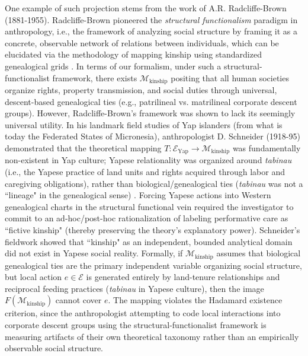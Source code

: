 \documentclass{article}
\theoremstyle{definition}
\begin{document}
One example of such projection stems from the work of A.R. Radcliffe-Brown (1881-1955). Radcliffe-Brown pioneered the \textit{structural functionalism} paradigm in anthropology, i.e., the framework of analyzing social structure by framing it as a concrete, observable network of relations between individuals, which can be elucidated via the methodology of mapping kinship using standardized genealogical grids \cite{RB52}. In terms of our formalism, under such a structural-functionalist framework, there exists $\mathcal{M}_{\text{kinship}}$ positing that all human societies organize rights, property transmission, and social duties through universal, descent-based genealogical ties (e.g., patrilineal vs. matrilineal corporate descent groups). However, Radcliffe-Brown's framework was shown to lack its seemingly universal utility. In his landmark field studies of Yap islanders (from what is today the Federated States of Micronesia), anthropologist D. Schneider (1918-95) demonstrated that the theoretical mapping $T: \mathcal{E}_{\text{Yap}} \to \mathcal{M}_{\text{kinship}}$ was fundamentally non-existent in Yap culture; Yapese relationality was organized around \textit{tabinau} (i.e., the Yapese practice of land units and rights acquired through labor and caregiving obligations), rather than biological/genealogical ties (\textit{tabinau} was not a ``lineage" in the genealogical sense) \cite{Hel97}. Forcing Yapese actions into Western genealogical charts in the structural functional vein required the investigator to commit to an ad-hoc/post-hoc rationalization of labeling performative care as ``fictive kinship" (thereby preserving the theory's explanatory power). Schneider's fieldwork showed that ``kinship" as an independent, bounded analytical domain did not exist in Yapese social reality. Formally, if $\mathcal{M}_{\text{kinship}}$ assumes that biological genealogical ties are the primary independent variable organizing social structure, but local action $e \in \mathcal{E}$ is generated entirely by land-tenure relationships and reciprocal feeding practices (\textit{tabinau} in Yapese culture), then the image $F(\mathcal{M}_{\text{kinship}})$ cannot cover $e$. The mapping violates the Hadamard existence criterion, since the anthropologist attempting to code local interactions into corporate descent groups using the structural-functionalist framework is measuring artifacts of their own theoretical taxonomy rather than an empirically observable social structure. \\
\\
\end{document}
